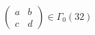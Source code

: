 \documentclass[12pt]{article}
\begin{document}
\(\displaystyle \begin{pmatrix}a&b\\c&d\end{pmatrix}\in\Gamma_0(32)\)
\end{document}
